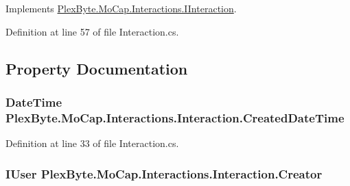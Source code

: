 Implements \hyperlink{interface_plex_byte_1_1_mo_cap_1_1_interactions_1_1_i_interaction_a5250247fb5f22a633e22d7f8dc946c4d}{Plex\+Byte.\+Mo\+Cap.\+Interactions.\+I\+Interaction}.



Definition at line 57 of file Interaction.\+cs.



\subsection{Property Documentation}
\subsubsection[{\texorpdfstring{Created\+Date\+Time}{CreatedDateTime}}]{\setlength{\rightskip}{0pt plus 5cm}Date\+Time Plex\+Byte.\+Mo\+Cap.\+Interactions.\+Interaction.\+Created\+Date\+Time\hspace{0.3cm}{\ttfamily [get]}}\hypertarget{class_plex_byte_1_1_mo_cap_1_1_interactions_1_1_interaction_a9802633b5c50cb92bd2f38f79417f50b}{}\label{class_plex_byte_1_1_mo_cap_1_1_interactions_1_1_interaction_a9802633b5c50cb92bd2f38f79417f50b}


Definition at line 33 of file Interaction.\+cs.

\subsubsection[{\texorpdfstring{Creator}{Creator}}]{\setlength{\rightskip}{0pt plus 5cm}I\+User Plex\+Byte.\+Mo\+Cap.\+Interactions.\+Interaction.\+Creator\hspace{0.3cm}{\ttfamily [get]}}\hypertarget{class_plex_byte_1_1_mo_cap_1_1_interactions_1_1_interaction_aa199ddc72121b749ffd44c52ddb03098}{}\label{class_plex_byte_1_1_mo_cap_1_1_interactions_1_1_interaction_aa199ddc72121b749ffd44c52ddb03098}



